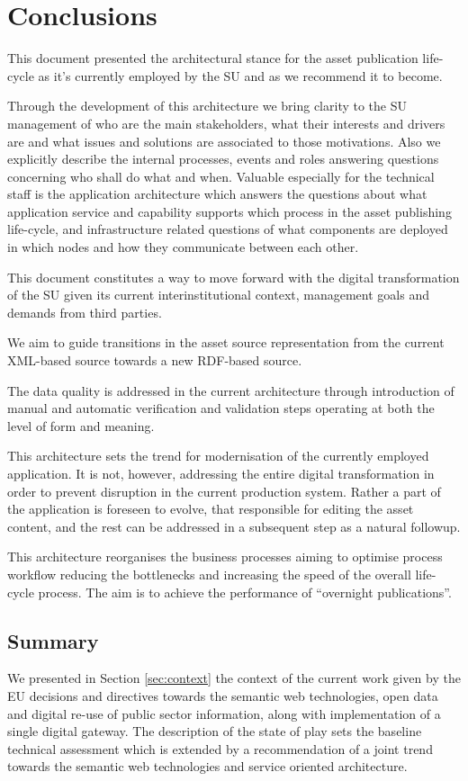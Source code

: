 \section{Conclusions}
\label{sec:conclusions}
	
	This document presented the architectural stance for the asset publication life-cycle as it's currently employed by the SU and as we recommend it to become.
	
	Through the development of this architecture we bring clarity to the SU management of who are the main stakeholders, what their interests and drivers are and what issues and solutions are associated to those motivations. Also we explicitly describe the internal processes, events and roles answering questions concerning who shall do what and when. Valuable especially for the technical staff is the application architecture which answers the questions about what application service and capability supports which process in the asset publishing life-cycle, and infrastructure related questions of what components are deployed in which nodes and how they communicate between each other. 
	
	This document constitutes a way to move forward with the digital transformation of the SU given its current interinstitutional context, management goals and demands from third parties.
	
	We aim to guide transitions in the asset source representation from the current XML-based source towards a new RDF-based source. 
	
    The data quality is addressed in the current architecture through introduction of manual and automatic verification and validation steps operating at both the level of form and meaning.
    
    This architecture sets the trend for modernisation of the currently employed application. It is not, however, addressing the entire digital transformation in order to prevent disruption in the current production system. Rather a part of the application is foreseen to evolve, that responsible for editing the asset content, and the rest can be addressed in a subsequent step as a natural followup.
	
	This architecture reorganises the business processes aiming to optimise process workflow reducing the bottlenecks and increasing the speed of the overall life-cycle process. The aim is to achieve the performance of ``overnight publications''. 

	\subsection{Summary}
	We presented in Section \ref{sec:context} the context of the current work given by the EU decisions and directives towards the semantic web technologies, open data and digital re-use of public sector information, along with implementation of a single digital gateway. The description of the state of play sets the baseline technical assessment which is extended by a recommendation of a joint trend towards the semantic web technologies and service oriented architecture.
	
